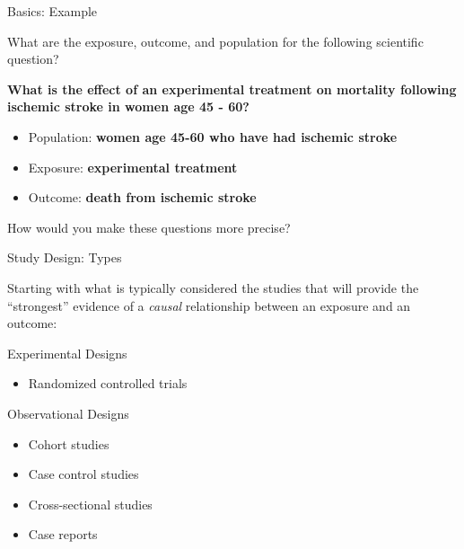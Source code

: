 \documentclass[ignorenonframetext,]{beamer}
\providecommand{\tightlist}{%
  \setlength{\itemsep}{0pt}\setlength{\parskip}{0pt}}
\begin{document}
\begin{frame}{Basics: Example}
\protect\hypertarget{basics-example-1}{}

What are the exposure, outcome, and population for the following
scientific question?

\textbf{What is the effect of an experimental treatment on mortality
following ischemic stroke in women age 45 - 60?}

\begin{itemize}
\tightlist
\item
  Population: \textbf{women age 45-60 who have had ischemic stroke}
\item
  Exposure: \textbf{experimental treatment}
\item
  Outcome: \textbf{death from ischemic stroke}
\end{itemize}

How would you make these questions more precise?

\end{frame}

\begin{frame}{Study Design: Types}
\protect\hypertarget{study-design-types}{}

Starting with what is typically considered the studies that will provide
the ``strongest'' evidence of a \emph{causal} relationship between an
exposure and an outcome:

Experimental Designs

\begin{itemize}
\tightlist
\item
  Randomized controlled trials
\end{itemize}

Observational Designs

\begin{itemize}
\tightlist
\item
  Cohort studies
\item
  Case control studies
\item
  Cross-sectional studies
\item
  Case reports
\end{itemize}

\end{frame}
\end{document}
